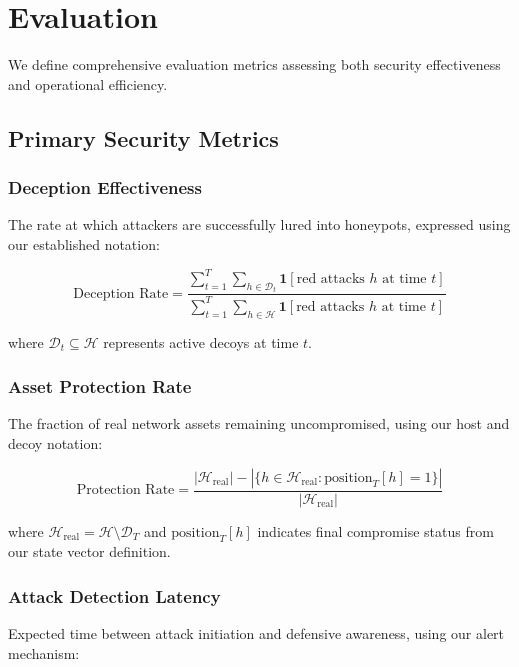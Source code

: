 \documentclass[12pt]{article}
\theoremstyle{definition}
\theoremstyle{plain}
\begin{document}
\section{Evaluation}

We define comprehensive evaluation metrics assessing both security effectiveness and operational efficiency.

\subsection{Primary Security Metrics}

\subsubsection{Deception Effectiveness}
The rate at which attackers are successfully lured into honeypots, expressed using our established notation:

\begin{equation}
\text{Deception Rate} = \frac{\sum_{t=1}^{T} \sum_{h \in \mathcal{D}_t} \mathbf{1}[\text{red attacks } h \text{ at time } t]}{\sum_{t=1}^{T} \sum_{h \in \mathcal{H}} \mathbf{1}[\text{red attacks } h \text{ at time } t]}
\end{equation}

where $\mathcal{D}_t \subseteq \mathcal{H}$ represents active decoys at time $t$.

\subsubsection{Asset Protection Rate}
The fraction of real network assets remaining uncompromised, using our host and decoy notation:

\begin{equation}
\text{Protection Rate} = \frac{|\mathcal{H}_{\text{real}}| - |\{h \in \mathcal{H}_{\text{real}} : \text{position}_T[h] = 1\}|}{|\mathcal{H}_{\text{real}}|}
\end{equation}

where $\mathcal{H}_{\text{real}} = \mathcal{H} \setminus \mathcal{D}_T$ and $\text{position}_T[h]$ indicates final compromise status from our state vector definition.

\subsubsection{Attack Detection Latency}
Expected time between attack initiation and defensive awareness, using our alert mechanism:
\end{document}
